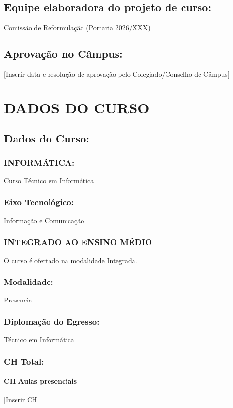 \documentclass{ifsc-ppc}
\begin{document}
\subsection{Equipe elaboradora do projeto de curso:}
Comissão de Reformulação (Portaria 2026/XXX)

\subsection{Aprovação no Câmpus:}
[Inserir data e resolução de aprovação pelo Colegiado/Conselho de Câmpus]

\section{DADOS DO CURSO}
\subsection{Dados do Curso:}

\subsubsection{INFORMÁTICA:}
Curso Técnico em Informática

\subsubsection{Eixo Tecnológico:}
Informação e Comunicação

\subsubsection{INTEGRADO AO ENSINO MÉDIO}
O curso é ofertado na modalidade Integrada.

\subsubsection{Modalidade:}
Presencial

\subsubsection{Diplomação do Egresso:}
Técnico em Informática

\subsubsection{CH Total:}
\paragraph{CH Aulas presenciais}
[Inserir CH]
\end{document}
